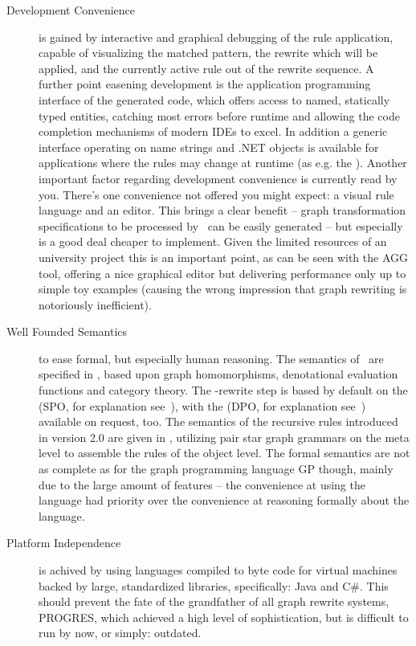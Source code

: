 \begin{description}
\item[Development Convenience]
is gained by interactive and graphical debugging of the rule application, capable of visualizing the matched pattern, the rewrite which will be applied, and the currently active rule out of the rewrite sequence.
A further point easening development is the application programming interface of the generated code,
which offers access to named, statically typed entities, catching most errors before runtime and allowing the code completion mechanisms of modern IDEs to excel.
In addition a generic interface operating on name strings and .NET objects is available for applications where the rules may change at runtime (as e.g. the \GrShell).
Another important factor regarding development convenience is currently read by you.
There's one convenience not offered you might expect: a visual rule language and an editor.
This brings a clear benefit -- graph transformation specifications to be processed by \GrG\ can be easily generated --
but especially is a good deal cheaper to implement. Given the limited resources of an university project this is an important point,
as can be seen with the AGG\cite{agg} tool, offering a nice graphical editor but delivering performance only up to simple toy examples 
(causing the wrong impression that graph rewriting is notoriously inefficient).

\item[Well Founded Semantics]
to ease formal, but especially human reasoning.
The semantics of \GrG\ are specified in \cite{DissRuby}, based upon graph homomorphisms, denotational evaluation functions and category theory.
The \GrG-rewrite step is based by default on the  (SPO, for explanation see~\cite{spoapproach}),
with the  (DPO, for explanation see~\cite{dpoapproach}) available on request, too.
The semantics of the recursive rules introduced in version 2.0 are given in \cite{Jak:08},
utilizing pair star graph grammars on the meta level to assemble the rules of the object level.
The formal semantics are not as complete as for the graph programming language GP\cite{gp} though, mainly due to the large amount of features 
-- the convenience at using the language had priority over the convenience at reasoning formally about the language.

\item[Platform Independence]
is achived by using languages compiled to byte code for virtual machines backed by large, standardized libraries, specifically: Java and C\#.
This should prevent the fate of the grandfather of all graph rewrite systems, PROGRES\cite{schuerr99progres},
which achieved a high level of sophistication, but is difficult to run by now, or simply: outdated.


\end{description}
